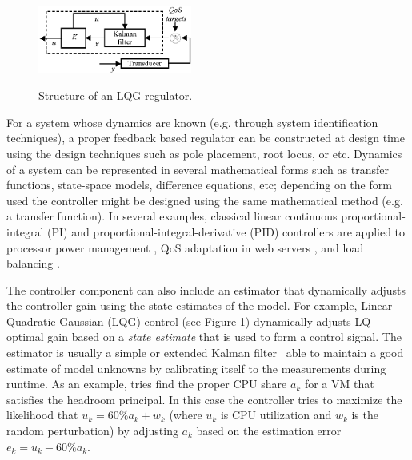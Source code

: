 \begin{figure}[b]
	\centering
	\includegraphics[width=0.45\textwidth]{image/loop/controller-LQG.eps} \label{fig:lqg1}		
	\caption{Structure of an LQG regulator.}  %
	\label{fig:lqg}
\end{figure}


For a system whose dynamics are known (e.g. through system identification techniques), a proper feedback based regulator can be constructed at design time using the design techniques such as pole placement, root locus, or etc. 
Dynamics of a system can be represented in several mathematical forms such as transfer functions, state-space models, difference equations, etc; depending on the form used the controller might be designed using the same mathematical method (e.g. a transfer function). 
In several examples, classical linear continuous proportional-integral (PI) and proportional-integral-derivative (PID) controllers are applied to
processor power management \cite{lu2002control,sharma2003power},
QoS adaptation in web servers  \cite{abdelzaher_performance_2002},
and load balancing \cite{hellerstein2004feedback,lu2002aqueduct,parekh2002using}. 

The controller component can also include an estimator that dynamically adjusts the controller gain using the state estimates of the model. For example, Linear-Quadratic-Gaussian (LQG) control (see Figure \ref{fig:lqg}) dynamically adjusts LQ-optimal gain based on a \textit{state estimate} that is used to form a control signal. The estimator is usually a simple or extended Kalman filter~\cite{welch_introduction_1995} able to maintain a good estimate of model unknowns by calibrating itself to the measurements during runtime.
As an example, \cite{kalyvianaki_self-adaptive_2009} tries find the proper CPU share $a_k$ for a VM that satisfies the headroom principal.  
In this case 
the controller tries to maximize the likelihood that $u_k=60\% a_k + w_k$ (where $u_k$ is CPU utilization and $w_k$ is the random perturbation) by adjusting $a_k$ based on the estimation error $e_k = u_k-60\% a_k$. %

